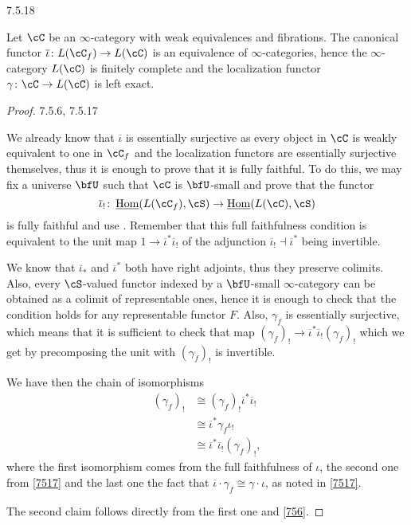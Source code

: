 \documentclass[a4paper,12pt]{scrartcl}
\begin{document}
\begin{prop}\label{7518}
  7.5.18

  Let $\cC$ be an $\infty$-category with weak equivalences and fibrations. The
  canonical functor $\overline{\iota}\colon L(\cC_f)\rightarrow L(\cC)$ is an
  equivalence of $\infty$-categories, hence the $\infty$-category $L(\cC)$ is
  finitely complete and the localization functor $\gamma\colon\cC\rightarrow
  L(\cC)$ is left exact.
\end{prop}
\begin{proof}
  7.5.6, 7.5.17

  We already know that $\overline{\iota}$ is essentially surjective as every
  object in $\cC$ is weakly equivalent to one in $\cC_f$ and the localization
  functors are essentially surjective themselves, thus it is enough to prove
  that it is fully faithful. To do this, we may fix a universe $\bfU$ such that
  $\cC$ is $\bfU$-small and prove that the functor
  \[\overline{\iota}_!\colon\Home(L(\cC_f),\cS)\rightarrow\Home(L(\cC),\cS)\]
  is fully faithful and use \cite[Prop.\ 6.1.15]{Cis19}. Remember that this full
  faithfulness condition is equivalent to the unit map
  $1\rightarrow\overline{\iota}^*\overline{\iota}_!$ of the adjunction
  $\overline{\iota}_!\dashv\overline{\iota}^*$ being invertible.

  We know that $\overline{\iota}_*$ and $\overline{\iota}^*$ both have right
  adjoints, thus they preserve colimits. Also, every $\cS$-valued functor
  indexed by a $\bfU$-small $\infty$-category can be obtained as a colimit of
  representable ones, hence it is enough to check that the condition holds for
  any representable functor $F$. Also, $\gamma_f$ is essentially surjective,
  which means that it is sufficient to check that map
  $(\gamma_f)_!\rightarrow\overline{\iota}^*\overline{\iota}_!(\gamma_f)_!$
  which we get by precomposing the unit with $(\gamma_f)_!$ is invertible.

  We have then the chain of isomorphisms
  \begin{align*}
    (\gamma_f)_! &\cong(\gamma_f)_!\overline{\iota}^*\overline{\iota}_! \\
                 &\cong\overline{\iota}^*\gamma_f\iota_! \\
                 &\cong\overline{\iota}^*\overline{\iota}_!(\gamma_f)_!,
  \end{align*}
  where the first isomorphism comes from the full faithfulness of $\iota$, the
  second one from \ref{7517} and the last one the fact that
  $\overline{\iota}\cdot\gamma_f\cong\gamma\cdot\iota$, as noted in \ref{7517}.

  The second claim follows directly from the first one and \ref{756}.
\end{proof}
\end{document}
